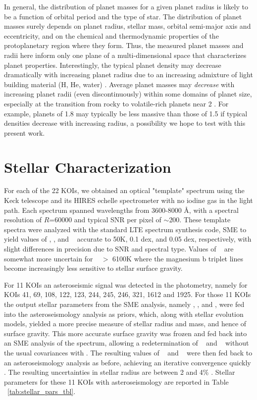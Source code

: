 \documentclass{emulateapj}
\begin{document}
In general, the distribution of planet masses for a given planet
radius is likely to be a function of orbital period and the type of
star.  The distribution of planet masses surely depends on planet
radius, stellar mass, orbital semi-major axis and eccentricity, and on the
chemical and thermodynamic properties of the protoplanetary region
where they form.  Thus, the measured planet masses and radii here inform
only one plane of a multi-dimensional space that characterizes planet
properties.  Interestingly, the typical planet density may decrease
dramatically with increasing planet radius due to an increasing
admixture of light building material (H, He, water) \citep{Weiss2013}.
Average planet masses may {\it decrease} with increasing planet radii
(even discontinuously) within some domains of planet size, especially
at the transition from rocky to volatile-rich planets near 2 \rearth.
For example, planets of 1.8 \rearth may typically be less massive than
those of 1.5 \rearth if typical densities decrease with increasing
radius, a possibility we hope to test with this present work.

\section{Stellar Characterization}
\label{sec:starchar}
For each of the 22 KOIs, we obtained an optical "template" spectrum
 using the Keck telescope and its HIRES echelle spectrometer with no
 iodine gas in the light path.  Each spectrum spanned wavelengths from
 3600-8000 \AA, with a spectral resolution of $R$=60000 and typical
 SNR per pixel of $\sim$200.  These template spectra were analyzed
 with the standard LTE spectrum synthesis code, SME \citep{Valenti96,
 Valenti2005, Fischer2005} to yield values of \teff, \logg, and \feh~ 
 accurate to 50K, 0.1 dex, and 0.05 dex, respectively, with slight
 differences in precision due to SNR and spectral type.  Values of
\logg~ are somewhat more uncertain for \teff~ $>$ 6100K where the
magnesium b triplet lines become increasingly less sensitive to
stellar surface gravity.

 For 11 KOIs an asteroseismic signal was detected in the \ek
 photometry, namely for KOIs 41, 69, 108, 122, 123, 244, 245, 246,
 321, 1612 and 1925. For those 11 KOIs the output stellar parameters
 from the SME analysis, namely \teff, \logg, and \feh, were fed into
 the asteroseismology analysis as priors, which, along with stellar
 evolution models, yielded a more precise measure of stellar radius
 and mass, and hence of surface gravity.  This more accurate surface
 gravity was frozen and fed back into an SME analysis of the spectrum,
 allowing a redetermination of \teff~ and \feh~ without the usual
 covariances with \logg.  The resulting values of \teff~ and \feh~
 were then fed back to an asteroseismology analysis as before,
 achieving an iterative convergence quickly \citep{Huber2013,
 Gilliland2013}.  The resulting uncertainties in stellar radius are
 between 2 and 4\% \citep{Huber2013}.  Stellar parameters for these 11
 KOIs with asteroseismology are reported in Table ~\ref{tab:stellar_pars_tbl}.
\end{document}
